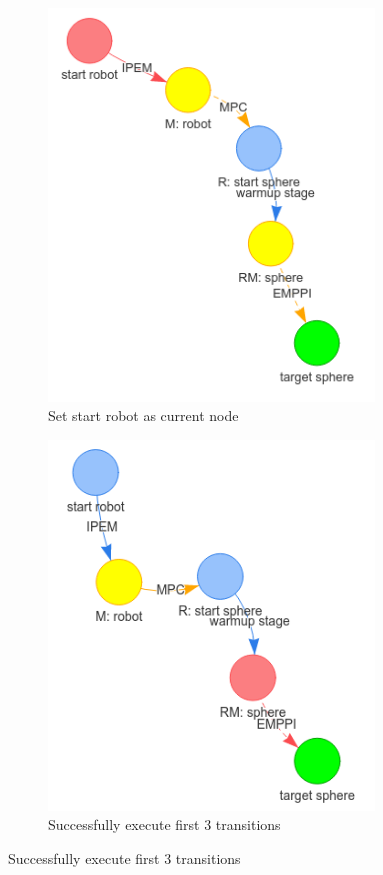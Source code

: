 \begin{figure}[H]
     \begin{subfigure}[b]{0.49\textwidth}
         \centering
         \includegraphics[width=0.95\textwidth]{figures/HGraph_example/4.png}
         \caption{Set start robot as current node}
     \end{subfigure}
     \hfill
     \begin{subfigure}[b]{0.49\textwidth}
         \centering
         \includegraphics[width=0.95\textwidth]{figures/HGraph_example/5.png}
         \caption{Successfully execute first 3 transitions}
     \end{subfigure}
     

\end{figure}
